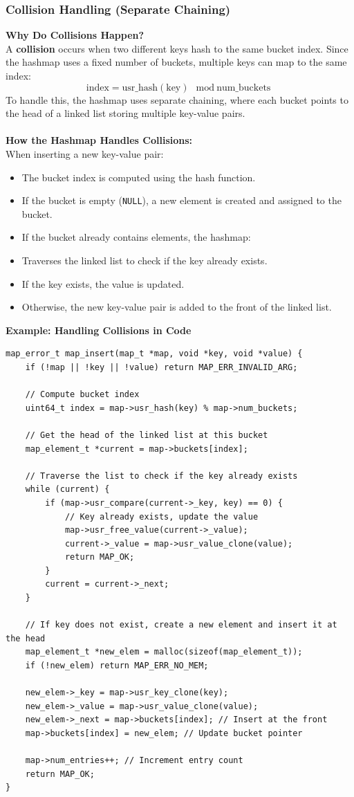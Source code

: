 \documentclass[titlepage]{article}
\begin{document}
\subsubsection{Collision Handling (Separate Chaining)}

\textbf{Why Do Collisions Happen?} \\
A \textbf{collision} occurs when two different keys hash to the same bucket index. Since the hashmap uses a fixed number of buckets, multiple keys can map to the same index:
\[
\text{index} = \text{usr\_hash}(\text{key}) \mod \text{num\_buckets}
\]
To handle this, the hashmap uses separate chaining, where each bucket points to the head of a linked list storing multiple key-value pairs.
\\
\\

\textbf{How the Hashmap Handles Collisions:} \\
When inserting a new key-value pair:
\begin{itemize}
\item The bucket index is computed using the hash function.
\item If the bucket is empty (\texttt{NULL}), a new element is created and assigned to the bucket.
\item If the bucket already contains elements, the hashmap:
\item Traverses the linked list to check if the key already exists.
\item If the key exists, the value is updated.
\item Otherwise, the new key-value pair is added to the front of the linked list.
\end{itemize}

\textbf{Example: Handling Collisions in Code}
\begin{verbatim}
map_error_t map_insert(map_t *map, void *key, void *value) {
    if (!map || !key || !value) return MAP_ERR_INVALID_ARG;

    // Compute bucket index
    uint64_t index = map->usr_hash(key) % map->num_buckets;

    // Get the head of the linked list at this bucket
    map_element_t *current = map->buckets[index];

    // Traverse the list to check if the key already exists
    while (current) {
        if (map->usr_compare(current->_key, key) == 0) {
            // Key already exists, update the value
            map->usr_free_value(current->_value);
            current->_value = map->usr_value_clone(value);
            return MAP_OK;
        }
        current = current->_next;
    }

    // If key does not exist, create a new element and insert it at the head
    map_element_t *new_elem = malloc(sizeof(map_element_t));
    if (!new_elem) return MAP_ERR_NO_MEM;

    new_elem->_key = map->usr_key_clone(key);
    new_elem->_value = map->usr_value_clone(value);
    new_elem->_next = map->buckets[index]; // Insert at the front
    map->buckets[index] = new_elem; // Update bucket pointer

    map->num_entries++; // Increment entry count
    return MAP_OK;
}
\end{verbatim}
\end{document}
